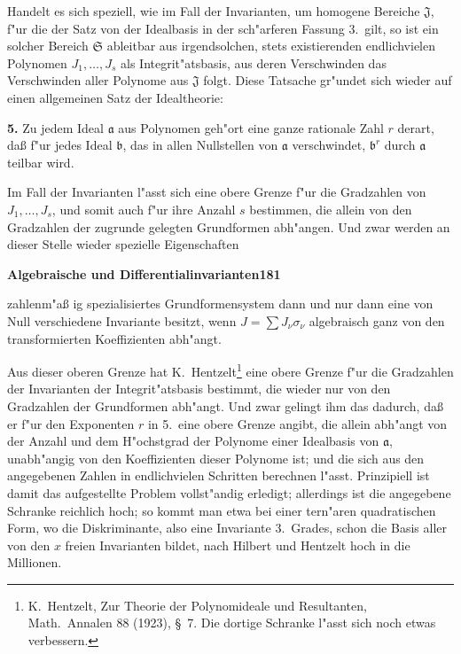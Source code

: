 \documentclass[12pt,a4paper]{article}
\begin{document}
{Handelt es sich speziell, wie im Fall der Invarianten, um homogene
Bereiche $\mathfrak{J}$, f"{u}r die der Satz von der Idealbasis in der sch"{a}rferen Fassung 3.\ gilt, so ist ein solcher Bereich $\mathfrak{S}$ ableitbar aus irgendsolchen, stets
existierenden endlichvielen Polynomen $J_{1},\dots,J_{s}$ als Integrit"{a}tsbasis,
aus deren Verschwinden das Verschwinden aller Polynome aus $\mathfrak{J}$ folgt.
Diese Tatsache gr"{u}ndet sich wieder auf einen allgemeinen Satz der Idealtheorie:

\textbf{5.} Zu jedem Ideal $\mathfrak{a}$ aus Polynomen geh"{o}rt eine ganze rationale Zahl $r$
derart, da{\ss} f"{u}r jedes Ideal $\mathfrak{b}$, das in allen Nullstellen von $\mathfrak{a}$ verschwindet,
$\mathfrak{b}^{r}$ durch $\mathfrak{a}$ teilbar wird.

Im Fall der Invarianten l"{a}sst sich eine obere Grenze f"{u}r die Gradzahlen
von $J_{1},\dots,J_{s}$, und somit auch f"{u}r ihre Anzahl $s$ bestimmen,
die allein von den Gradzahlen der zugrunde gelegten Grundformen abh"{a}ngen.
Und zwar werden an dieser Stelle wieder spezielle Eigenschaften

\newpage
\begin{center}
\textbf{Algebraische und Differentialinvarianten}\quad\textbf{181}
\end{center}

zahlenm"{a}{\ss} ig spezialisiertes Grundformensystem dann und nur dann eine
von Null verschiedene Invariante besitzt, wenn $J=\sum J_{\nu}\sigma_{\nu}$ algebraisch
ganz von den transformierten Koeffizienten abh"{a}ngt.

Aus dieser oberen Grenze hat K.~Hentzelt\footnote{K.~Hentzelt, Zur Theorie der Polynomideale und Resultanten, Math.\ Annalen
88 (1923), \S~7. Die dortige Schranke l"{a}sst sich noch etwas verbessern.} eine obere Grenze f"{u}r
die Gradzahlen der Invarianten der Integrit"{a}tsbasis bestimmt, die wieder
nur von den Gradzahlen der Grundformen abh"{a}ngt. Und zwar gelingt
ihm das dadurch, da{\ss} er f"{u}r den Exponenten $r$ in 5.\ eine obere Grenze
angibt, die allein abh"{a}ngt von der Anzahl und dem H"{o}chstgrad der
Polynome einer Idealbasis von $\mathfrak{a}$, unabh"{a}ngig von den Koeffizienten
dieser Polynome ist; und die sich aus den angegebenen Zahlen in
endlichvielen Schritten berechnen l"{a}sst. Prinzipiell ist damit das aufgestellte
Problem vollst"{a}ndig erledigt; allerdings ist die angegebene Schranke
reichlich hoch; so kommt man etwa bei einer tern"{a}ren quadratischen
Form, wo die Diskriminante, also eine Invariante 3.\ Grades, schon
die Basis aller von den $x$ freien Invarianten bildet, nach Hilbert und
Hentzelt hoch in die Millionen.

}
\end{document}
